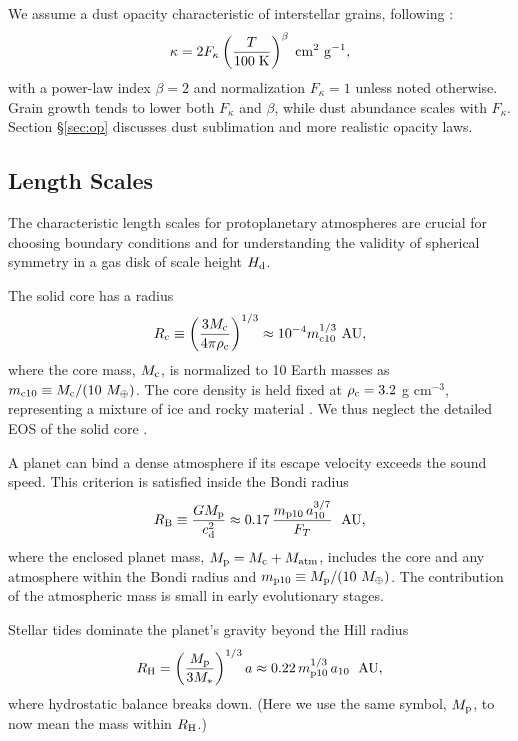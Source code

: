 \documentclass[apj, numberedappendix]{emulateapj}
\newcommand{\AU}{\; {\rm AU}}
\newcommand{\RB}{R_{\rm B}}
\newcommand{\RH}{R_{\rm H}}
\newcommand{\co}{_{\rm c}}
\newcommand{\pla}{_{\rm p}}
\newcommand{\di}{_{\rm d}}
\newcommand{\mcn}[1] { m_{ \rm c #1} }
\newcommand{\mpn}[1] { m_{ \rm p #1} }
\newcommand{\aun}[1]{ a_{#1} }
\begin{document}
We assume a dust opacity characteristic of interstellar grains, following \citet{bell94}:
\begin{equation}
\label{eq:opacitylaw}
\kappa= 2 F_\kappa  \left(\frac{T}{100\; \rm{K}}\right)^{\beta} \; \mathrm{cm^2 ~ g^{-1}},
\end{equation}
with a power-law index $\beta = 2$ and normalization $F_\kappa = 1$ unless noted otherwise. Grain growth tends to lower both $F_\kappa$ and $\beta$, while dust abundance scales with $F_\kappa$.   Section \S\ref{sec:op} discusses dust sublimation and more realistic opacity laws.


\subsection{Length Scales}
\label{sec:scales}

The characteristic length scales for protoplanetary atmospheres are crucial for choosing boundary conditions and for understanding the validity of  spherical symmetry in a gas disk of scale height $H\di$.

The solid core has a radius
\begin{equation}
\label{eq:rc}
R\co \equiv \left(\frac{3 M\co}{4 \pi \rho\co}\right)^{1/3} \approx 10^{-4} \mcn{10}^{1/3} ~\text{AU},
\end{equation}
where the core mass, $M\co$, is normalized to 10 Earth masses as $\mcn{10} \equiv M\co/(10~M_\oplus)$. The core density is held fixed at $\rho\co=3.2$ g cm$^{-3}$, representing a mixture of ice and rocky material \citep{pap99}.  We thus neglect  the detailed EOS of the solid core \citep{fortney07}.

A planet can bind a dense atmosphere if its escape velocity exceeds the sound speed.  This criterion is satisfied inside the Bondi radius
\begin{equation}
\label{eq:RB}
\RB \equiv \frac{G M\pla}{c\di^2} \approx 0.17 \, {\mpn{10}  \, \aun{10}^{3/7} \over F_T} ~\AU,
\end{equation}
where the enclosed planet mass, $M\pla = M\co + M_\mathrm{atm}$, includes the core and any atmosphere within the Bondi radius and $\mpn{10} \equiv M\pla /(10~M_\oplus)$.   The contribution of the atmospheric mass is small in early evolutionary stages.

Stellar tides dominate the planet's gravity beyond the Hill radius
\begin{equation}
\label{eq:RHill}
R_{\rm H} = \left(M\pla \over 3 M_\ast \right)^{1/3}a \approx 0.22 \, {\mpn{10}^{1/3} \, \aun{10} }~\AU ,
\end{equation}
where hydrostatic balance breaks down.  (Here we use the same symbol, $M\pla$, to now mean the mass within $\RH$.) 
\end{document}
